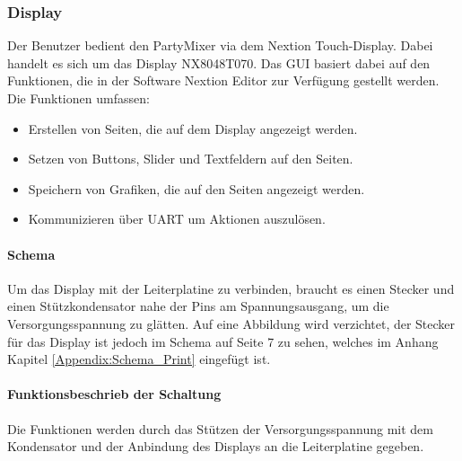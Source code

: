 \subsubsection{Display}
\label{subsubsec:Display}

Der Benutzer bedient den PartyMixer via dem Nextion Touch-Display. Dabei handelt es sich um das Display NX8048T070. Das GUI basiert dabei auf den Funktionen, die in der Software Nextion Editor zur Verfügung gestellt werden. Die Funktionen umfassen:
\begin{itemize}
\item Erstellen von Seiten, die auf dem Display angezeigt werden.
\item Setzen von Buttons, Slider und Textfeldern auf den Seiten.
\item Speichern von Grafiken, die auf den Seiten angezeigt werden.
\item Kommunizieren über UART um Aktionen auszulösen.
\end{itemize}

\paragraph{Schema}\mbox{}

Um das Display mit der Leiterplatine zu verbinden, braucht es einen Stecker und einen Stützkondensator nahe der Pins am Spannungsausgang, um die Versorgungsspannung zu glätten. Auf eine Abbildung wird verzichtet, der Stecker für das Display ist jedoch im Schema auf Seite 7 zu sehen, welches im Anhang Kapitel \ref{Appendix:Schema_Print} eingefügt ist.

\paragraph{Funktionsbeschrieb der Schaltung}\mbox{}

Die Funktionen werden durch das Stützen der Versorgungsspannung mit dem Kondensator und der Anbindung des Displays an die Leiterplatine gegeben.